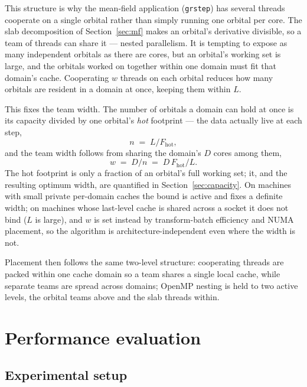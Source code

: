 \documentclass[preprint,12pt]{elsarticle}
\numberwithin{equation}{section}
\begin{document}
This structure is why the mean-field application (\texttt{grstep}) has several threads cooperate on a single orbital rather than simply running one orbital per core. The slab decomposition of Section~\ref{sec:mf} makes an orbital's derivative divisible, so a team of threads can share it --- nested parallelism. It is tempting to expose as many independent orbitals as there are cores, but an orbital's working set is large, and the orbitals worked on together within one domain must fit that domain's cache. Cooperating $w$ threads on each orbital reduces how many orbitals are resident in a domain at once, keeping them within $L$.

This fixes the team width. The number of orbitals a domain can hold at once is its capacity divided by one orbital's \emph{hot} footprint --- the data actually live at each step,
\begin{equation}\label{eq:cap}
n \;=\; L/F_{\text{hot}},
\end{equation}
and the team width follows from sharing the domain's $D$ cores among them,
\begin{equation}\label{eq:width}
w \;=\; D/n \;=\; D\,F_{\text{hot}}/L.
\end{equation}
The hot footprint is only a fraction of an orbital's full working set; it, and the resulting optimum width, are quantified in Section~\ref{sec:capacity}. On machines with small private per-domain caches the bound is active and fixes a definite width; on machines whose last-level cache is shared across a socket it does not bind ($L$ is large), and $w$ is set instead by transform-batch efficiency and NUMA placement, so the algorithm is architecture-independent even where the width is not.

Placement then follows the same two-level structure: cooperating threads are packed within one cache domain so a team shares a single local cache, while separate teams are spread across domains; OpenMP nesting is held to two active levels, the orbital teams above and the slab threads within.

\section{Performance evaluation}\label{sec:eval}

\subsection{Experimental setup}\label{sec:setup}
\end{document}
